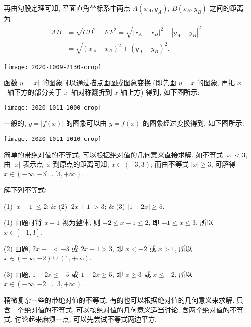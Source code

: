 再由勾股定理可知, 平面直角坐标系中两点 $A(x_A,y_A)$, $B(x_B,y_B)$ 之间的距离为
\begin{align*}
  AB&= \sqrt{CD^2+EF^2}
     = \sqrt{|x_A-x_B|^2+|y_A-y_B|^2}\\
    &= \sqrt{(x_A-x_B)^2+(y_A-y_B)^2}.
\end{align*}

\begin{center}
  \texttt{[image: 2020-1009-2130-crop]}
\end{center}

函数 $y=|x|$ 的图象可以通过描点画图或图象变换 (即先画 $y=x$ 的图象, 再把 $x$~轴下方的部分关于 $x$~轴对称翻折到 $x$ 轴上方) 得到, 如下图所示:

\begin{center}
  \texttt{[image: 2020-1011-1000-crop]}
\end{center}

一般的, $y= |f(x)|$ 的图象可以由 $y=f(x)$ 的图象经过变换得到, 如下图所示:

\begin{center}
  \texttt{[image: 2020-1011-1010-crop]}
\end{center}

简单的带绝对值的不等式, 可以根据绝对值的几何意义直接求解. 如不等式 $|x|<3$, 由 $|x|$ 表示点~$x$ 到原点的距离可知,  $x\in (-3,3)$; 而由不等式 $|x|\geqslant 3$, 可解得 $x\in(-\infty,-3]\cup[3,+\infty)$.

\begin{example}
  解下列不等式:
  \begin{threecolpro}
    (1) $|x-1|\leqslant 2$; & (2) $|2x+1|> 3$; & (3) $|1-2x|\geqslant 5$.
  \end{threecolpro}
\end{example}
\begin{solution}
  (1) 由题可将 $x-1$ 视为整体, 则 $-2\leqslant x-1\leqslant 2$, 即 $-1\leqslant x\leqslant 3$, 所以 $x\in [-1,3]$.
  
  (2) 由题, $2x+1<-3$ 或 $2x+1>3$, 即 $x<-2$ 或 $x>1$, 所以 $x\in(-\infty,-2)\cup (1,+\infty)$.
  
  (3) 由题, $1-2x\leqslant -5$ 或 $1-2x\geqslant 5$, 即 $x\geqslant 3$ 或 $x\leqslant -2$, 所以 $x\in(-\infty,-2]\cup [3,+\infty)$.
\end{solution}

稍微复杂一些的带绝对值的不等式, 有的也可以根据绝对值的几何意义来求解. 只含一个绝对值的不等式, 可以按绝对值的几何意义适当讨论; 含两个绝对值的不等式, 讨论起来麻烦一点, 可以先尝试不等式两边平方.

